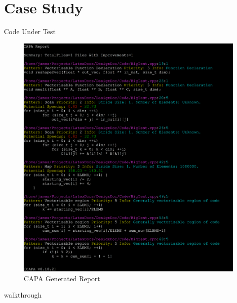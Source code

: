 
\section{Case Study} %
Code Under Test

\pagebreak
\begin{figure}[H]
\includegraphics[width=\textwidth]{./Pictures/Report.png}
\caption{CAPA Generated Report}
\end{figure}
walkthrough




